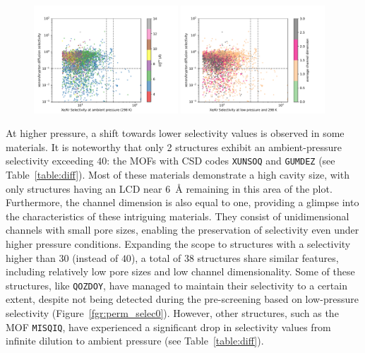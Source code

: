 \documentclass[main]{subfiles}
\begin{document}
\begin{figure}[ht]
  \centering
    \includegraphics[width=0.48\textwidth]{figures/5-diffusion/diff_D_xekr-s2080-lcd.pdf}
    \includegraphics[width=0.48\textwidth]{figures/5-diffusion/diff_D_xekr-s2080-chandim.pdf}
    \caption{}\label{fgr:perm_selec2080}
\end{figure}


At higher pressure, a shift towards lower selectivity values is observed in some materials. It is noteworthy that only 2 structures exhibit an ambient-pressure selectivity exceeding $40$: the MOFs with CSD codes \texttt{XUNSOQ}\autocite{Abrahams_2014} and \texttt{GUMDEZ}\autocite{Yin_2014}  (see Table~\ref{table:diff}). Most of these materials demonstrate a high cavity size, with only structures having an LCD near \SI{6}{\angstrom} remaining in this area of the plot. Furthermore, the channel dimension is also equal to one, providing a glimpse into the characteristics of these intriguing materials. They consist of unidimensional channels with small pore sizes, enabling the preservation of selectivity even under higher pressure conditions. Expanding the scope to structures with a selectivity higher than $30$ (instead of $40$), a total of 38 structures share similar features, including relatively low pore sizes and low channel dimensionality. Some of these structures, like \texttt{QOZDOY}\autocite{Zhang_2001}, have managed to maintain their selectivity to a certain extent, despite not being detected during the pre-screening based on low-pressure selectivity (Figure~\ref{fgr:perm_selec0}). However, other structures, such as the MOF \texttt{MISQIQ}\autocite{Tong_2013}, have experienced a significant drop in selectivity values from infinite dilution to ambient pressure (see Table~\ref{table:diff}).
\end{document}
